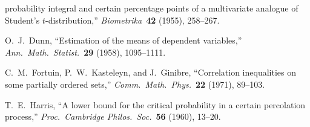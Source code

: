 \documentclass[12pt,a4paper]{article}
\theoremstyle{definition}
\begin{document}
\begin{enumerate}[nosep,label={[\arabic*]}]
    probability integral and certain percentage points of a multivariate
    analogue of Student's $t$-distribution,'' \textit{Biometrika}\
    \textbf{42} (1955), 258--267.
  \item O.\ J.\ Dunn, ``Estimation of the means of dependent variables,''
    \textit{Ann.\ Math.\ Statist.}\ \textbf{29} (1958), 1095--1111.
  \item C.\ M.\ Fortuin, P.\ W.\ Kasteleyn, and J.\ Ginibre,
    ``Correlation inequalities on some partially ordered sets,''
    \textit{Comm.\ Math.\ Phys.}\ \textbf{22} (1971), 89--103.
  \item T.\ E.\ Harris, ``A lower bound for the critical probability in a
    certain percolation process,'' \textit{Proc.\ Cambridge Philos.\
    Soc.}\ \textbf{56} (1960), 13--20.
\end{enumerate}
\end{document}
